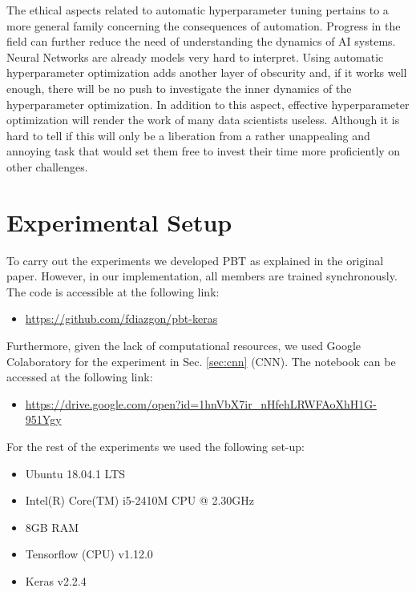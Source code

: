 \documentclass{article}
\begin{document}
The ethical aspects related to automatic hyperparameter tuning pertains to a more general family concerning the consequences of automation. Progress in the field can further reduce the need of understanding the dynamics of AI systems. Neural Networks are already models very hard to interpret. Using automatic hyperparameter optimization adds another layer of obscurity and, if it works well enough, there will be no push to investigate the inner dynamics of the hyperparameter optimization. In addition to this aspect, effective hyperparameter optimization will render the work of many data scientists useless. Although it is hard to tell if this will only be a liberation from a rather unappealing and annoying task that would set them free to invest their time more proficiently on other challenges.

\appendix
\section{Experimental Setup}

To carry out the experiments we developed PBT as explained in the original paper. However, in our implementation, all members are trained synchronously. The code is accessible at the following link:

\begin{itemize}
    \item \url{https://github.com/fdiazgon/pbt-keras}
\end{itemize}

Furthermore, given the lack of computational resources, we used Google Colaboratory for the experiment in Sec. \ref{sec:cnn} (CNN). The notebook can be accessed at the following link:

\begin{itemize}
    \item \url{https://drive.google.com/open?id=1hnVbX7ir_nHfehLRWFAoXhH1G-951Ygy}
\end{itemize}

For the rest of the experiments we used the following set-up:

\begin{itemize}
    \item Ubuntu 18.04.1 LTS
    \item Intel(R) Core(TM) i5-2410M CPU @ 2.30GHz
    \item 8GB RAM
    \item Tensorflow (CPU) v1.12.0
    \item Keras v2.2.4
\end{itemize}

\printbibliography
\end{document}
